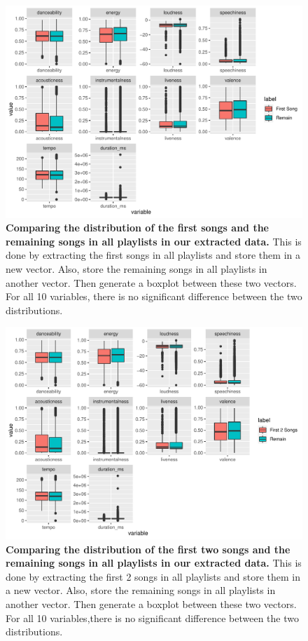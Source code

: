 \documentclass[12pt]{article}
\theoremstyle{plain}
\theoremstyle{definition}
\theoremstyle{remark}
\begin{document}
\begin{figure}[htp]
    \centering
    \includegraphics[width=\textwidth]{Images/1st.pdf}
    \caption{\textbf{Comparing the distribution of the first songs and the remaining songs in all playlists in our extracted data.} This is done by extracting the first songs in all playlists and store them in a new vector. Also, store the remaining songs in all playlists in another vector. Then generate a boxplot between these two vectors. For all 10 variables, there is no significant difference between the two distributions.}
    \label{fig:1st}
\end{figure}

\begin{figure}[htp]
    \centering
    \includegraphics[width=\textwidth]{Images/1st2.pdf}
    \caption{\textbf{Comparing the distribution of the first two songs and the remaining songs in all playlists in our extracted data.} This is done by extracting the first 2 songs in all playlists and store them in a new vector. Also, store the remaining songs in all playlists in another vector. Then generate a boxplot between these two vectors. For all 10 variables,there is no significant difference between the two distributions. }
    \label{fig:1st2}
\end{figure}
\end{document}
